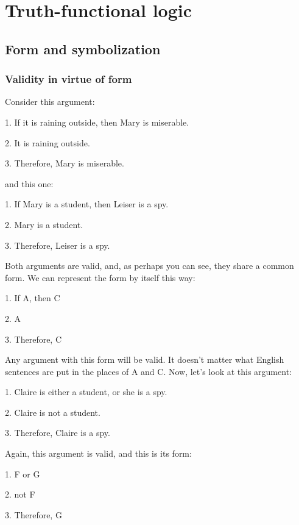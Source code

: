 \part{Truth-functional logic}
\label{ch.TFL}

\chapter{Form and symbolization}

\section{Validity in virtue of form}\label{s:ValidityInVirtueOfForm}
Consider this argument:
	\begin{earg}
		\item[1.] If it is raining outside, then Mary is miserable.
		\item[2.] It is raining outside.
		\item[3.] Therefore, Mary is miserable.
	\end{earg}
and this one:
	\begin{earg}
		\item[1.] If Mary is a student, then Leiser is a spy.
		\item[2.] Mary is a student.
		\item[3.] Therefore, Leiser is a spy.
	\end{earg}
Both arguments are valid, and, as perhaps you  can see, they share a common form. We can represent the form by itself this way:
	\begin{earg}
		\item[1.] If A, then C
		\item[2.] A
		\item[3.] Therefore, C
	\end{earg}
Any argument with this form will be valid. It doesn't matter what English sentences are put in the places of A and C. 
Now, let's look at this argument:
	\begin{earg}
		\item[1.] Claire is either a student, or she is a spy.
		\item[2.] Claire is not a student.
		\item[3.] Therefore, Claire is a spy.
	\end{earg}
Again, this argument is valid, and this is its form:
	\begin{earg}
		\item[1.] F or G
		\item[2.] not F
		\item[3.] Therefore, G
	\end{earg}
